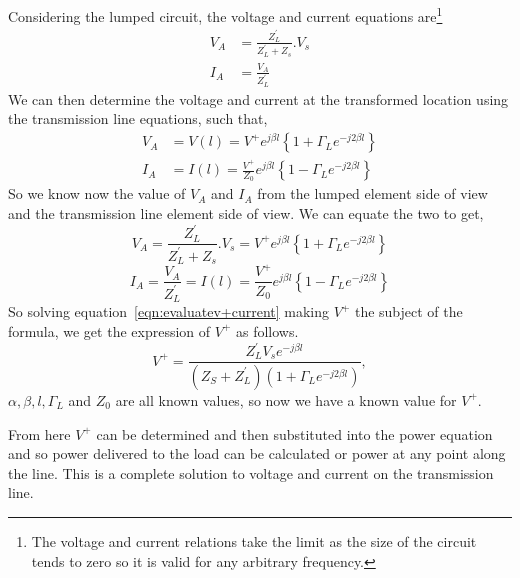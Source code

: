 Considering the lumped circuit, the voltage and current equations are\footnote{
The voltage and current relations take the limit as the size of the circuit tends to zero so it is valid for any arbitrary frequency.
}
\begin{align}
V_A &= \frac{Z^'_L}{Z^{'}_L + Z_s} . V_s\label{eqn:transimpvoltage}\\
I_A &= \frac{V_A}{Z^{'}_L}\label{eqn:transimpcurrent}
\end{align} 
We can then determine the voltage and current at the transformed location using the transmission line equations, such that,
\begin{align*} 
V_A &= V(l) = V^+ e^{j\beta l} \left\lbrace 1 + \Gamma_L e^{-j2\beta l} \right\rbrace\\
I_A &= I(l) = \frac{V^+}{Z_0} e^{j\beta l} \left\lbrace 1 - \Gamma_L e^{-j2\beta l} \right\rbrace
\end{align*}
So we know now the value of $V_A$ and $I_A$ from the lumped element side of view and the transmission line element side of view. We can equate the two to get,
\begin{equation} 
V_A = \frac{Z^{'}_L}{Z^{'}_L + Z_s} . V_s = V^+ e^{j\beta l} \left\lbrace 1 + \Gamma_L e^{-j2\beta l} \right\rbrace\label{eqn:evaluatev+voltage}
\end{equation}
\begin{equation}
I_A = \frac{V_A}{Z^{'}_L} = I(l) = \frac{V^+}{Z_0} e^{j\beta l} \left\lbrace 1 - \Gamma_L e^{-j2\beta l} \right\rbrace
\label{eqn:evaluatev+current}
\end{equation}
So solving equation~\ref{eqn:evaluatev+current} making $V^{+}$ the subject of the formula, we get the expression of $V^+$ as follows. 
\begin{equation} 
V^+ = \frac{Z^{'}_L V_s e^{-j\beta l}}{(Z_S + Z^{'}_L)(1 + \Gamma_L e^{-j2\beta l })}, 
\end{equation}
$\alpha, \beta, l, \Gamma_L$ and $Z_0$ are all known values, so now we have a known value for $V^+$.

From here $V^+$ can be determined and then substituted into the power equation and so power delivered to the load can be calculated or power at any point along the line. This is a complete solution to voltage and current on the transmission line.

